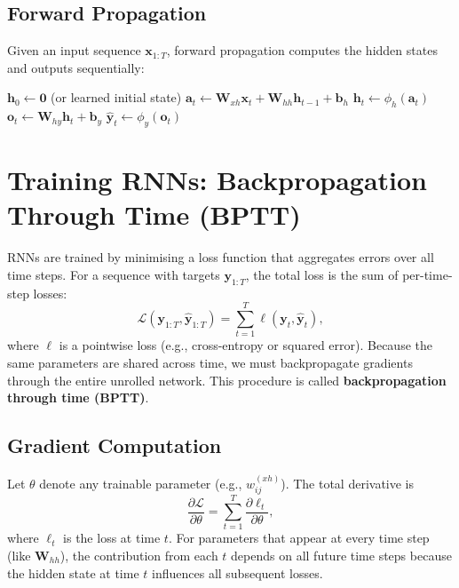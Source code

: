 \documentclass{tufte-handout}
\begin{document}
\subsection{Forward Propagation}

Given an input sequence $\mathbf{x}_{1:T}$, forward propagation computes the hidden states and outputs sequentially:

\begin{algorithm}[h]
    \caption{Forward pass of an RNN}
    \begin{algorithmic}[1]
        \State $\mathbf{h}_0 \gets \mathbf{0}$ (or learned initial state)
            \State $\mathbf{a}_t \gets \mathbf{W}_{xh}\mathbf{x}_t + \mathbf{W}_{hh}\mathbf{h}_{t-1} + \mathbf{b}_h$
            \State $\mathbf{h}_t \gets \phi_h(\mathbf{a}_t)$
            \State $\mathbf{o}_t \gets \mathbf{W}_{hy}\mathbf{h}_t + \mathbf{b}_y$
            \State $\hat{\mathbf{y}}_t \gets \phi_y(\mathbf{o}_t)$
        \EndFor
    \end{algorithmic}
\end{algorithm}

\section{Training RNNs: Backpropagation Through Time (BPTT)}

RNNs are trained by minimising a loss function that aggregates errors over all time steps. For a sequence with targets $\mathbf{y}_{1:T}$, the total loss is the sum of per-time-step losses:
\[
\mathcal{L}(\mathbf{y}_{1:T}, \hat{\mathbf{y}}_{1:T}) = \sum_{t=1}^{T} \ell(\mathbf{y}_t, \hat{\mathbf{y}}_t),
\]
where $\ell$ is a pointwise loss (e.g., cross-entropy or squared error). Because the same parameters are shared across time, we must backpropagate gradients through the entire unrolled network. This procedure is called \textbf{backpropagation through time (BPTT)}.

\subsection{Gradient Computation}

Let $\theta$ denote any trainable parameter (e.g., $w_{ij}^{(xh)}$). The total derivative is
\[
\frac{\partial \mathcal{L}}{\partial \theta} = \sum_{t=1}^{T} \frac{\partial \ell_t}{\partial \theta},
\]
where $\ell_t$ is the loss at time $t$. For parameters that appear at every time step (like $\mathbf{W}_{hh}$), the contribution from each $t$ depends on all future time steps because the hidden state at time $t$ influences all subsequent losses.
\end{document}
